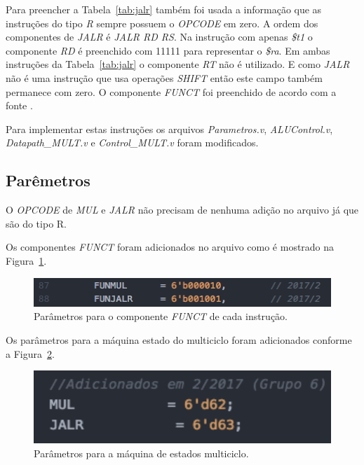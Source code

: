 \documentclass[12pt]{article}
\begin{document}
Para preencher a Tabela~\ref{tab:jalr} também foi usada a informação que as instruções do tipo \textit{R} sempre possuem o \textit{OPCODE} em zero. A ordem dos componentes de \textit{JALR} é \textit{JALR RD RS}. Na instrução com apenas \textit{\$t1} o componente \textit{RD} é preenchido com 11111 para representar o \textit{\$ra}. Em ambas instruções da Tabela~\ref{tab:jalr} o componente \textit{RT} não é utilizado. E como \textit{JALR} não é uma instrução que usa operações \textit{SHIFT} então este campo também permanece com zero. O componente \textit{FUNCT} foi preenchido de acordo com a fonte \cite{mips32}.

Para implementar estas instruções os arquivos \textit{Parametros.v}, \textit{ALUControl.v}, \textit{Datapath\_MULT.v} e \textit{Control\_MULT.v} foram modificados. 

\subsection{Parêmetros}
\label{subsec:param}

O \textit{OPCODE} de \textit{MUL} e \textit{JALR} não precisam de nenhuma adição no arquivo já que são do tipo R.

Os componentes \textit{FUNCT} foram adicionados no arquivo como é mostrado na Figura~\ref{fig:pfunct}.

\begin{figure}[H]
	\flushleft
	\includegraphics[width=1\textwidth]{pfunct.png}
	\caption{Parâmetros para o componente \textit{FUNCT} de cada instrução.}
	\label{fig:pfunct}
\end{figure}

Os parâmetros para a máquina estado do multiciclo foram adicionados conforme a Figura~\ref{fig:pest}.

\begin{figure}[H]
	\flushleft
	\includegraphics[width=1\textwidth]{pest.png}
	\caption{Parâmetros para a máquina de estados multiciclo.}
	\label{fig:pest}
\end{figure}
\end{document}
